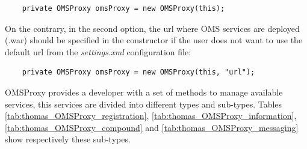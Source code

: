 \begin{lstlisting}
	private OMSProxy omsProxy = new OMSProxy(this);
\end{lstlisting}

On the contrary, in the second option, the url where OMS services are deployed (.war) should be specified in the constructor if the user does not want to use the default url from the \textit{settings.xml} configuration file:

\begin{lstlisting}
	private OMSProxy omsProxy = new OMSProxy(this, "url");
\end{lstlisting} 


OMSProxy provides a developer with a set of methods to manage available services, this services are divided into different types and sub-types.
 Tables \ref{tab:thomas_OMSProxy_registration}, \ref{tab:thomas_OMSProxy_information}, \ref{tab:thomas_OMSProxy_compound} and \ref{tab:thomas_OMSProxy_messaging} show respectively these sub-types.





